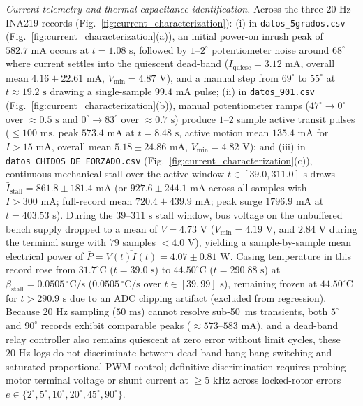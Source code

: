 \documentclass[lettersize,journal]{IEEEtran}
\begin{document}
	\textit{Current telemetry and thermal capacitance identification.} Across the three $20\text{ Hz}$ INA219 records (Fig.~\ref{fig:current_characterization}): (i) in \texttt{datos\_5grados.csv} (Fig.~\ref{fig:current_characterization}(a)), an initial power-on inrush peak of $582.7\text{ mA}$ occurs at $t = 1.08\text{ s}$, followed by $1\text{--}2^\circ$ potentiometer noise around $68^\circ$ where current settles into the quiescent dead-band ($I_{\text{quiesc}} = 3.12\text{ mA}$, overall mean $4.16 \pm 22.61\text{ mA}$, $V_{\min} = 4.87\text{ V}$), and a manual step from $69^\circ$ to $55^\circ$ at $t \approx 19.2\text{ s}$ drawing a single-sample $99.4\text{ mA}$ pulse; (ii) in \texttt{datos\_901.csv} (Fig.~\ref{fig:current_characterization}(b)), manual potentiometer ramps ($47^\circ \to 0^\circ$ over $\approx 0.5\text{ s}$ and $0^\circ \to 83^\circ$ over $\approx 0.7\text{ s}$) produce $1\text{--}2$ sample active transit pulses ($\le 100\text{ ms}$, peak $573.4\text{ mA}$ at $t = 8.48\text{ s}$, active motion mean $135.4\text{ mA}$ for $I > 15\text{ mA}$, overall mean $5.18 \pm 24.86\text{ mA}$, $V_{\min} = 4.82\text{ V}$); and (iii) in \texttt{datos\_CHIDOS\_DE\_FORZADO.csv} (Fig.~\ref{fig:current_characterization}(c)), continuous mechanical stall over the active window $t \in [39.0, 311.0]\text{ s}$ draws $\bar{I}_{\text{stall}} = 861.8 \pm 181.4\text{ mA}$ (or $927.6 \pm 244.1\text{ mA}$ across all samples with $I > 300\text{ mA}$; full-record mean $720.4 \pm 439.9\text{ mA}$; peak surge $1796.9\text{ mA}$ at $t = 403.53\text{ s}$). During the $39\text{--}311\text{ s}$ stall window, bus voltage on the unbuffered bench supply dropped to a mean of $\bar{V} = 4.73\text{ V}$ ($V_{\min} = 4.19\text{ V}$, and $2.84\text{ V}$ during the terminal surge with $79$ samples $< 4.0\text{ V}$), yielding a sample-by-sample mean electrical power of $\bar{P} = \overline{V(t)I(t)} = 4.07 \pm 0.81\text{ W}$. Casing temperature in this record rose from $31.7^\circ\text{C}$ ($t = 39.0\text{ s}$) to $44.50^\circ\text{C}$ ($t = 290.88\text{ s}$) at $\beta_{\text{stall}} = 0.0505\,^\circ\text{C/s}$ ($0.0505\,^\circ\text{C/s}$ over $t \in [39, 99]\text{ s}$), remaining frozen at $44.50^\circ\text{C}$ for $t > 290.9\text{ s}$ due to an ADC clipping artifact (excluded from regression). Because $20\text{ Hz}$ sampling ($50\text{ ms}$) cannot resolve sub-50~ms transients, both $5^\circ$ and $90^\circ$ records exhibit comparable peaks ($\approx 573\text{--}583\text{ mA}$), and a dead-band relay controller also remains quiescent at zero error without limit cycles, these $20\text{ Hz}$ logs do not discriminate between dead-band bang-bang switching and saturated proportional PWM control; definitive discrimination requires probing motor terminal voltage or shunt current at $\ge 5\text{ kHz}$ across locked-rotor errors $e \in \{2^\circ, 5^\circ, 10^\circ, 20^\circ, 45^\circ, 90^\circ\}$.
	
\end{document}
